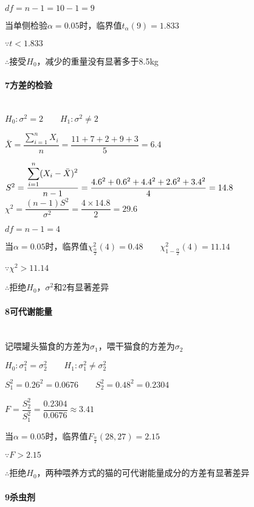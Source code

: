 \documentclass[UTF8]{ctexart}
\begin{document}
$df=n-1=10-1=9$

当单侧检验$\alpha=0.05$时，临界值$t_{\alpha}(9)=1.833$

$\because t < 1.833$

$\therefore$接受$H_0$，减少的重量没有显著多于8.5kg

\paragraph{7方差的检验}
~\\

$H_0:\sigma^2=2 \qquad H_1:\sigma^2\ne2$


$\bar{X}=\dfrac{\displaystyle \sum_{i=1}^{n}X_i}{n}=\dfrac{11+7+2+9+3}{5}=6.4$

$S^2=\dfrac{\displaystyle \sum_{i=1}^n (X_i-\Bar{X})^2}{n-1}=\dfrac{4.6^2+0.6^2+4.4^2+2.6^2+3.4^2}{4}=14.8$
~\\


$\chi^2=\dfrac{(n-1)S^2}{\sigma^2}=\dfrac{4\times 14.8}{2}=29.6$

$df=n-1=4$

当$\alpha=0.05$时，临界值$\chi^2_{\frac{\alpha}{2}}(4)=0.48 \qquad \chi^2_{1-\frac{\alpha}{2}}(4)=11.14$

$\because \chi^2 > 11.14$

$\therefore$拒绝$H_0$，$\sigma^2$和2有显著差异

\paragraph{8可代谢能量}
~\\

记喂罐头猫食的方差为$\sigma_1$，喂干猫食的方差为$\sigma_2$

$H_0:\sigma_1^2=\sigma_2^2 \qquad H_1:\sigma_1^2\ne\sigma_2^2$

$S_1^2=0.26^2=0.0676 \qquad S_2^2=0.48^2=0.2304$

$F=\dfrac{S_2^2}{S_1^2}=\dfrac{0.2304}{0.0676}\approx3.41$

当$\alpha=0.05$时，临界值$F_{\frac{\alpha}{2}}(28,27)=2.15$

$\because F > 2.15$

$\therefore$拒绝$H_0$，两种喂养方式的猫的可代谢能量成分的方差有显著差异

\paragraph{9杀虫剂}
~\\
\end{document}
